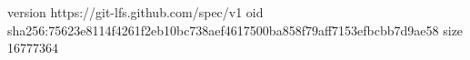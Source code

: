 version https://git-lfs.github.com/spec/v1
oid sha256:75623e8114f4261f2eb10bc738aef4617500ba858f79aff7153efbcbb7d9ae58
size 16777364
